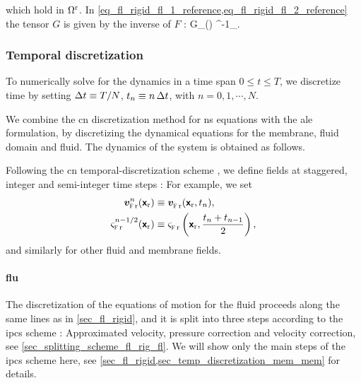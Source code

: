 which hold in $\Omega^{\textrm{r}}$. In \cref{eq_fl_rigid_fl_1_reference,eq_fl_rigid_fl_2_reference} the tensor $G$ is given by the inverse of $F$ \cite{kamenskyLectureNotesMAE}:
\be
\label{eq_def_G}
G_{\alpha \beta}(\bu) \equiv [F(\bu)]^{-1}_{\alpha \beta}.
\ee\vspace{5mm}



\subsubsection{Temporal discretization}\label{sec_temp_discretization_mem}

To numerically solve for the dynamics in a time span $0 \leq t \leq T$, we discretize time by setting ${\Delta t} \equiv T/N$, $t_n \equiv n\, {\Delta t}$, with $n = 0, 1, \cdots, N$.

We combine the \ac{cn} discretization method for \ac{ns} equations \cite{loggAutomatedSolutionDifferential2012,crankPracticalMethodNumerical1947} with the \ac{ale} formulation, by discretizing the dynamical equations for the membrane, fluid domain and  fluid.
The  dynamics of the system is obtained as follows.\\ \vspace{5mm}




Following the \ac{cn} temporal-discretization scheme \cite{crankPracticalMethodNumerical1947}, we define fields at staggered,  integer and semi-integer time steps  \cite{loggAutomatedSolutionDifferential2012}: For example, we set
\begin{align}
    \label{eq_time_step_1}
    \bvfr{n}(\bxr)          & \equiv \bvfr{}(\bxr, t_n)  ,                               \\
    \label{eq_time_step_2}
    \sigmafr{\nmhalf}(\bxr) & \equiv \sigmafr{}\left(\bxr, \frac{t_n+t_{n-1}}{2}\right),
\end{align}
and similarly for other fluid and membrane fields.


\paragraph{\Acl{flu}}\label{sec_temp_discretization_mem_bflu}


The discretization of the equations of motion for  the fluid proceeds along the same lines as in \cref{sec_fl_rigid}, and it is split into three steps according to the \ac{ipcs} scheme \cite{loggAutomatedSolutionDifferential2012,chorinNumericalSolutionNavierStokes1968}: Approximated velocity, pressure correction and velocity correction, see \cref{sec_splitting_scheme_fl_rig_fl}. We will show only the main steps of the \ac{ipcs} scheme here, see \cref{sec_fl_rigid,sec_temp_discretization_mem_mem} for details.



